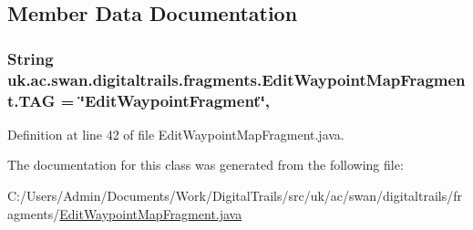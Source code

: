 \subsection{Member Data Documentation}
\hypertarget{classuk_1_1ac_1_1swan_1_1digitaltrails_1_1fragments_1_1_edit_waypoint_map_fragment_a509156cbfb92d25de0fbac3095043506}{
\subsubsection[{T\+A\+G}]{\setlength{\rightskip}{0pt plus 5cm}String uk.\+ac.\+swan.\+digitaltrails.\+fragments.\+Edit\+Waypoint\+Map\+Fragment.\+T\+A\+G = \char`\"{}Edit\+Waypoint\+Fragment\char`\"{}\hspace{0.3cm}{\ttfamily [static]}, {\ttfamily [private]}}}\label{classuk_1_1ac_1_1swan_1_1digitaltrails_1_1fragments_1_1_edit_waypoint_map_fragment_a509156cbfb92d25de0fbac3095043506}


Definition at line 42 of file Edit\+Waypoint\+Map\+Fragment.\+java.



The documentation for this class was generated from the following file\+:\begin{DoxyCompactItemize}
\item 
C\+:/\+Users/\+Admin/\+Documents/\+Work/\+Digital\+Trails/src/uk/ac/swan/digitaltrails/fragments/\hyperlink{_edit_waypoint_map_fragment_8java}{Edit\+Waypoint\+Map\+Fragment.\+java}\end{DoxyCompactItemize}
